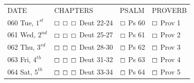 \documentclass[11pt,landscape,twocolumn,letterpaper]{article}
\begin{document}
\begin{tabular}{p{0.85in}p{1.25in}p{1.2in}p{1.2in}}
DATE & CHAPTERS & PSALM & PROVERB \\
\tiny 060 \normalsize Tue, $1^{st}$ & $\boxempty$ $\boxempty$ $\boxempty$ \hspace{.05in} \textcolor[rgb]{1.00,0.00,0.00}{Deut 22-24} & $\boxempty$ \hspace{.05in} \textcolor[rgb]{0.00,1.00,0.00}{Ps 60} &  $\boxempty$ \hspace{.05in} \textcolor[rgb]{0.00,0.00,1.00}{Prov 1}   \\

\tiny 061 \normalsize Wed, $2^{nd}$ & $\boxempty$ $\boxempty$ $\boxempty$ \hspace{.05in} \textcolor[rgb]{1.00,0.00,0.00}{Deut 25-27} & $\boxempty$ \hspace{.05in} \textcolor[rgb]{0.00,1.00,0.00}{Ps 61} &  $\boxempty$ \hspace{.05in} \textcolor[rgb]{0.00,0.00,1.00}{Prov 2}   \\

\tiny 062 \normalsize Thu, $3^{rd}$ & $\boxempty$ $\boxempty$ $\boxempty$ \hspace{.05in} \textcolor[rgb]{1.00,0.00,0.00}{Deut 28-30} & $\boxempty$ \hspace{.05in} \textcolor[rgb]{0.00,1.00,0.00}{Ps 62} &  $\boxempty$ \hspace{.05in} \textcolor[rgb]{0.00,0.00,1.00}{Prov 3}   \\

\tiny 063 \normalsize Fri, $4^{th}$ & $\boxempty$ $\boxempty$ $\boxempty$ \hspace{.05in} \textcolor[rgb]{1.00,0.00,0.00}{Deut 31-32} & $\boxempty$ \hspace{.05in} \textcolor[rgb]{0.00,1.00,0.00}{Ps 63} &  $\boxempty$ \hspace{.05in} \textcolor[rgb]{0.00,0.00,1.00}{Prov 4}   \\

\tiny 064 \normalsize Sat, $5^{th}$ & $\boxempty$ $\boxempty$ $\boxempty$ \hspace{.05in} \textcolor[rgb]{1.00,0.00,0.00}{Deut 33-34} & $\boxempty$ \hspace{.05in} \textcolor[rgb]{0.00,1.00,0.00}{Ps 64} &  $\boxempty$ \hspace{.05in} \textcolor[rgb]{0.00,0.00,1.00}{Prov 5}   \\

\end{tabular} 
\end{document}
